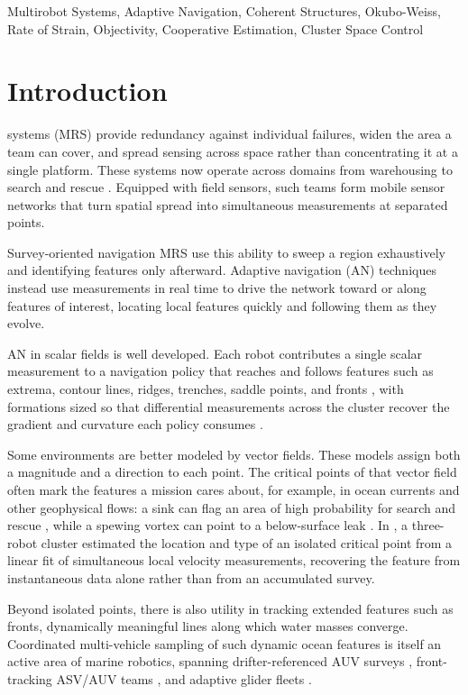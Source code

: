 \documentclass[lettersize,journal]{IEEEtran}
\begin{document}
\begin{IEEEkeywords}
Multirobot Systems, Adaptive Navigation, Coherent Structures,
Okubo-Weiss, Rate of Strain, Objectivity, Cooperative
Estimation, Cluster Space Control
\end{IEEEkeywords}

\section{Introduction}
\label{sec:intro}

 systems (MRS) provide redundancy against
individual failures, widen the area a team can cover, and spread
sensing across space rather than concentrating it at a single
platform. These systems now operate across domains from warehousing
to search and rescue \cite{1}. Equipped with field sensors, such
teams form mobile sensor networks that turn spatial spread into
simultaneous measurements at separated points.

Survey-oriented navigation MRS use this ability to sweep a region exhaustively and identifying features only
afterward. Adaptive navigation (AN) techniques instead use
measurements in real time to drive the network toward or along
features of interest, locating local features quickly and following
them as they evolve.

AN in scalar fields is well developed. Each robot contributes a single
scalar measurement to a navigation policy that reaches and follows
features such as extrema, contour lines, ridges, trenches, saddle
points, and fronts \cite{2,3,4,5}, with formations sized so that
differential measurements across the cluster recover the gradient and
curvature each policy consumes \cite{6,2}.

Some environments are better modeled by vector fields. These models
assign both a magnitude and a direction to each point. The critical
points of that vector field often mark the features a mission cares
about, for example, in ocean currents and other geophysical flows: a
sink can flag an area of high probability for search and rescue
\cite{7}, while a spewing vortex can point to a below-surface leak
\cite{8}.
In \cite{9}, a three-robot cluster estimated the location and type of
an isolated critical point from a linear fit of simultaneous local
velocity measurements, recovering the feature from instantaneous data
alone rather than from an accumulated survey.

Beyond isolated points, there is also utility in tracking extended
features such as fronts, dynamically meaningful lines along which
water masses converge. Coordinated multi-vehicle sampling of such
dynamic ocean features is itself an active area of marine robotics,
spanning drifter-referenced AUV surveys \cite{10}, front-tracking
ASV/AUV teams \cite{11}, and adaptive glider fleets \cite{12}.
\end{document}
